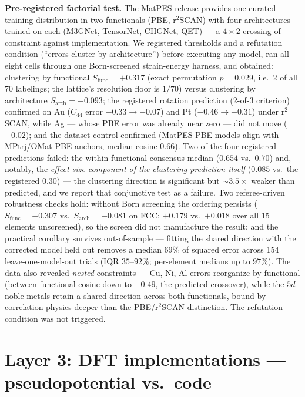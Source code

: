 \documentclass[11pt]{article}
\begin{document}
\textbf{Pre-registered factorial test.} The MatPES release \citep{kaplan2025}
provides one curated training distribution in two functionals (PBE, r$^2$SCAN)
with four architectures trained on each (M3GNet, TensorNet, CHGNet, QET) ---
a $4{\times}2$ crossing of constraint against implementation. We registered
thresholds and a refutation condition (``errors cluster by architecture'')
before executing any model, ran all eight cells through one Born-screened
strain-energy harness, and obtained: clustering by functional
$S_{\mathrm{func}} = +0.317$ (exact permutation $p = 0.029$, i.e.\ 2 of all 70
labelings; the lattice's resolution floor is $1/70$) versus clustering by
architecture $S_{\mathrm{arch}} = -0.093$; the registered rotation prediction
(2-of-3 criterion) confirmed on Au ($C_{44}$ error $-0.33 \to -0.07$) and Pt
($-0.46 \to -0.31$) under r$^2$SCAN, while Ag --- whose PBE error was already
near zero --- did not move ($-0.02$); and the dataset-control confirmed
(MatPES-PBE models align with MPtrj/OMat-PBE anchors, median cosine $0.66$).
Two of the four registered predictions failed: the within-functional
consensus median ($0.654$ vs.\ $0.70$) and, notably, the \emph{effect-size
component of the clustering prediction itself} ($0.085$ vs.\ the registered
$0.30$) --- the clustering direction is significant but ${\sim}3.5\times$
weaker than predicted, and we report that conjunctive test as a failure.
Two referee-driven robustness checks hold: without Born screening the
ordering persists ($S_{\mathrm{func}} = +0.307$ vs.\
$S_{\mathrm{arch}} = -0.081$ on FCC; $+0.179$ vs.\ $+0.018$ over all 15
elements unscreened), so the screen did not manufacture the result; and the
practical corollary survives out-of-sample --- fitting the shared direction
with the corrected model held out removes a median $69\%$ of squared error
across 154 leave-one-model-out trials (IQR $35$--$92\%$; per-element medians
up to $97\%$). The data also revealed \emph{nested} constraints --- Cu, Ni,
Al errors
reorganize by functional (between-functional cosine down to $-0.49$, the
predicted crossover), while the $5d$ noble metals retain a shared direction
across both functionals, bound by correlation physics deeper than the
PBE/r$^2$SCAN distinction. The refutation condition was not triggered.

\section{Layer 3: DFT implementations --- pseudopotential vs.\ code}
\label{sec:dft}
\end{document}
